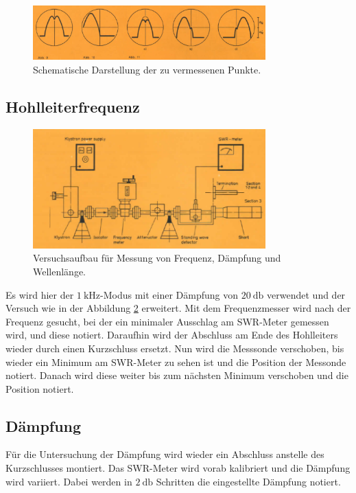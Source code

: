 \begin{figure}
    \centering
    \includegraphics[width=0.8\textwidth]{Bilder/dip.png}
    \caption{Schematische Darstellung der zu vermessenen Punkte.}
    \label{fig:dip}
\end{figure}
\FloatBarrier

\subsection{Hohlleiterfrequenz}

\begin{figure}
    \centering
    \includegraphics[width=0.8\textwidth]{Bilder/aufbau_freq.png}
    \caption{Versuchsaufbau für Messung von Frequenz, Dämpfung und Wellenlänge.}
    \label{fig:hohl}
\end{figure}
\FloatBarrier

Es wird hier der $\SI{1}{\kilo\hertz} $-Modus mit einer Dämpfung von $\SI{20}{\decibel} $ verwendet und der Versuch wie in der Abbildung \ref{fig:hohl} erweitert. Mit dem Frequenzmesser wird 
nach der Frequenz gesucht, bei der ein minimaler Ausschlag am SWR-Meter gemessen wird, und diese notiert. Daraufhin wird der Abschluss am Ende des Hohlleiters wieder durch einen 
Kurzschluss ersetzt. Nun wird die Messsonde verschoben, bis wieder ein Minimum am SWR-Meter zu sehen ist und die Position der Messonde notiert. Danach wird diese weiter bis zum 
nächsten Minimum verschoben und die Position notiert. 

\subsection{Dämpfung}
Für die Untersuchung der Dämpfung wird wieder ein Abschluss anstelle des Kurzschlusses montiert. Das SWR-Meter wird vorab kalibriert und die Dämpfung wird variiert. Dabei werden 
in $\SI{2}{\decibel} $ Schritten die eingestellte Dämpfung notiert. 

